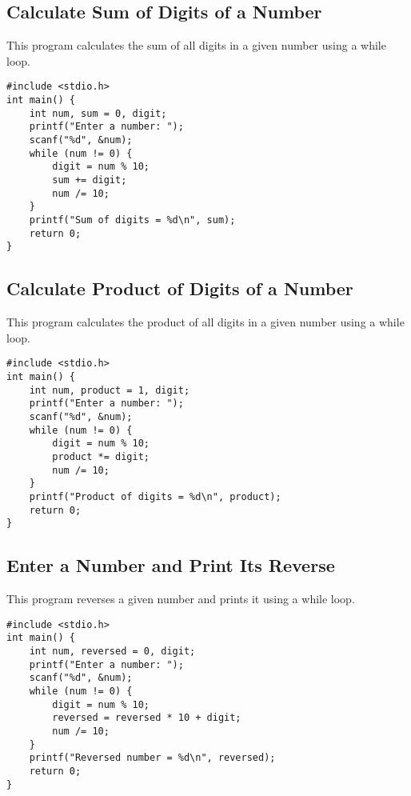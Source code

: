 \documentclass[a4paper,12pt]{article}
\begin{document}
\newpage

\subsection{Calculate Sum of Digits of a Number}
This program calculates the sum of all digits in a given number using a while loop.

\begin{lstlisting}[caption={Calculate Sum of Digits of a Number}]
#include <stdio.h>
int main() {
    int num, sum = 0, digit;
    printf("Enter a number: ");
    scanf("%d", &num);
    while (num != 0) {
        digit = num % 10;
        sum += digit;
        num /= 10;
    }
    printf("Sum of digits = %d\n", sum);
    return 0;
}
\end{lstlisting}

\newpage

\subsection{Calculate Product of Digits of a Number}
This program calculates the product of all digits in a given number using a while loop.

\begin{lstlisting}[caption={Calculate Product of Digits of a Number}]
#include <stdio.h>
int main() {
    int num, product = 1, digit;
    printf("Enter a number: ");
    scanf("%d", &num);
    while (num != 0) {
        digit = num % 10;
        product *= digit;
        num /= 10;
    }
    printf("Product of digits = %d\n", product);
    return 0;
}
\end{lstlisting}

\newpage

\subsection{Enter a Number and Print Its Reverse}
This program reverses a given number and prints it using a while loop.

\begin{lstlisting}[caption={Enter a Number and Print Its Reverse}]
#include <stdio.h>
int main() {
    int num, reversed = 0, digit;
    printf("Enter a number: ");
    scanf("%d", &num);
    while (num != 0) {
        digit = num % 10;
        reversed = reversed * 10 + digit;
        num /= 10;
    }
    printf("Reversed number = %d\n", reversed);
    return 0;
}
\end{lstlisting}
\end{document}
